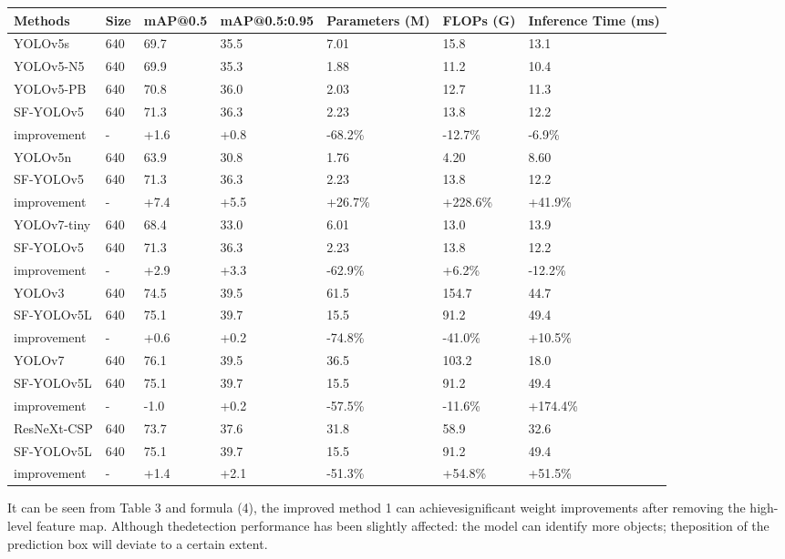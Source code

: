 \documentclass[
  10
]{article}
\newcounter{none} %
\begin{document}
{\def\LTcaptype{none} %
\begin{longtable}[]{@{}|l|l|l|l|l|l|l|@{}}
\toprule\noalign{}
\endhead
\bottomrule\noalign{}
\endlastfoot
\hline
Methods & Size & mAP@0.5 & mAP@0.5:0.95 & Parameters (M) & FLOPs (G) &
Inference Time (ms) \\
\hline
YOLOv5s & 640 & 69.7 & 35.5 & 7.01 & 15.8 & 13.1 \\
\hline
YOLOv5-N5 & 640 & 69.9 & 35.3 & 1.88 & 11.2 & 10.4 \\
\hline
YOLOv5-PB & 640 & 70.8 & 36.0 & 2.03 & 12.7 & 11.3 \\
\hline
SF-YOLOv5 & 640 & 71.3 & 36.3 & 2.23 & 13.8 & 12.2 \\
\hline
improvement & - & +1.6 & +0.8 & -68.2\% & -12.7\% & -6.9\% \\
\hline
YOLOv5n & 640 & 63.9 & 30.8 & 1.76 & 4.20 & 8.60 \\
\hline
SF-YOLOv5 & 640 & 71.3 & 36.3 & 2.23 & 13.8 & 12.2 \\
\hline
improvement & - & +7.4 & +5.5 & +26.7\% & +228.6\% & +41.9\% \\
\hline
YOLOv7-tiny & 640 & 68.4 & 33.0 & 6.01 & 13.0 & 13.9 \\
\hline
SF-YOLOv5 & 640 & 71.3 & 36.3 & 2.23 & 13.8 & 12.2 \\
\hline
improvement & - & +2.9 & +3.3 & -62.9\% & +6.2\% & -12.2\% \\
\hline
YOLOv3 & 640 & 74.5 & 39.5 & 61.5 & 154.7 & 44.7 \\
\hline
SF-YOLOv5L & 640 & 75.1 & 39.7 & 15.5 & 91.2 & 49.4 \\
\hline
improvement & - & +0.6 & +0.2 & -74.8\% & -41.0\% & +10.5\% \\
\hline
YOLOv7 & 640 & 76.1 & 39.5 & 36.5 & 103.2 & 18.0 \\
\hline
SF-YOLOv5L & 640 & 75.1 & 39.7 & 15.5 & 91.2 & 49.4 \\
\hline
improvement & - & -1.0 & +0.2 & -57.5\% & -11.6\% & +174.4\% \\
\hline
ResNeXt-CSP & 640 & 73.7 & 37.6 & 31.8 & 58.9 & 32.6 \\
\hline
SF-YOLOv5L & 640 & 75.1 & 39.7 & 15.5 & 91.2 & 49.4 \\
\hline
improvement & - & +1.4 & +2.1 & -51.3\% & +54.8\% & +51.5\% \\
\hline
\end{longtable}
}

It can be seen from Table 3 and formula (4), the improved method 1 can
achievesignificant weight improvements after removing the high-level
feature map. Although thedetection performance has been slightly
affected: the model can identify more objects; theposition of the
prediction box will deviate to a certain extent.
\end{document}
